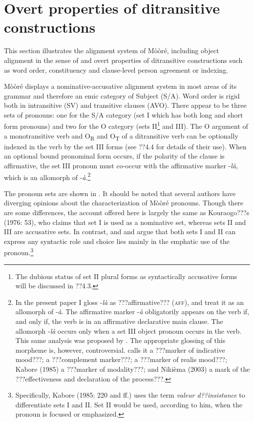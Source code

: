 \documentclass[output=paper]{langsci/langscibook}
\begin{document}
\section{Overt properties of ditransitive constructions }

This section illustrates the alignment system of Mòòré, including object alignment in the sense of \citet{MalchukovEtAl2010} and overt properties of ditransitive constructions such as word order, constituency and clause-level person agreement or indexing.


Mòòré displays a nominative-accusative alignment system in most areas of its grammar and therefore an emic category of Subject (S/A). Word order is rigid both in intransitive (SV) and transitive clauses (AVO). There appear to be three sets of pronouns: one for the S/A category (set I which has both long and short form pronouns) and two for the O category (sets II\footnote{ The dubious status of set II plural forms as syntactically accusative forms will be discussed in ??4.3.}{ }and III). The O argument of a monotransitive verb and O\textsubscript{R} and O\textsubscript{T} of a ditransitive verb can be optionally indexed in the verb by the set III forms (see ??4.4 for details of their use). When an optional bound pronominal form occurs, if the polarity of the clause is affirmative, the set III pronoun must co-occur with the affirmative marker -\textit{là}, which is an allomorph of -\textit{à}.\footnote{{In the present paper I gloss -}{\textit{là}}{ as ???affirmative??? (}{\textsc{aff}}{), and treat it as an allomorph of -}{\textit{à}}{. The affirmative marker -}{\textit{à}}{ obligatorily appears on the verb if, and only if, the verb is in an affirmative declarative main clause. The allomorph -}{\textit{là}}{ occurs only when a set III object pronoun occurs in the verb. This same analysis was proposed by \citet{Manessy1963}. The appropriate glossing of this morpheme is, however, controversial. \citet[96]{Alexandre1953} calls it a ???marker of indicative mood???; \citet[112]{Peterson1971} a ???complement marker???; \citet{Canu1976} a ???marker of realis mood???; Kabore} {(1985) a ???marker of modality???; and Nikièma (2003) a mark of the ???effectiveness and declaration of the process???.}} 

The pronoun sets are shown in . It should be noted that several authors have diverging opinions about the characterization of Mòòré pronouns. Though there are some differences, the account offered here is largely the same as Kouraogo???s (1976: 53), who claims that set I is used as a nominative set, whereas sets II and III are accusative sets. In contrast, \citet{Canu1974} and \citet{Kabore1985} and argue that both sets I and II can express any syntactic role and choice lies mainly in the emphatic use of the pronoun.\footnote{ Specifically, Kabore (1985: 220 and ff.) uses the term \textit{valeur d??insistance} to differentiate sets I and II. Set II would be used, according to him, when the pronoun is focused or emphasized. }{ }
\end{document}
